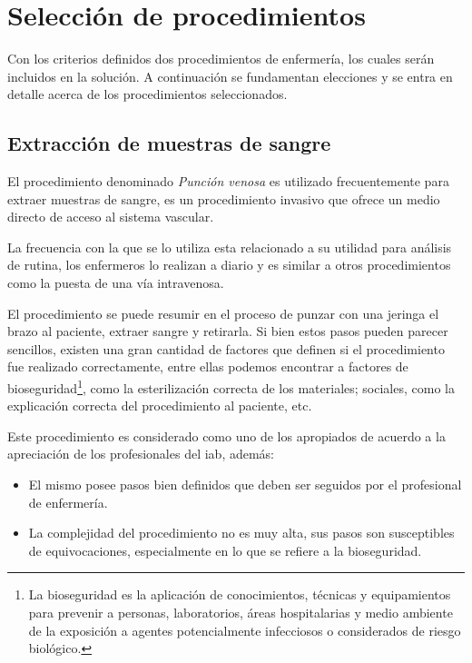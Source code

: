 \section{Selección de procedimientos}
\label{sec:seleccion_escenas}

Con los criterios definidos  dos procedimientos
de enfermería, los cuales serán incluidos en la solución. A continuación se
fundamentan  elecciones y se entra en detalle acerca de los
procedimientos seleccionados.


\subsection{Extracción de muestras de sangre}
\label{sec:hemocultivo}

El procedimiento denominado \emph{Punción venosa} es utilizado frecuentemente
para extraer muestras de sangre, es un procedimiento invasivo que ofrece un
medio directo de acceso al sistema vascular. 

La frecuencia con la que se lo utiliza esta relacionado a su utilidad para
análisis de rutina, los enfermeros lo realizan a diario y es similar a otros
procedimientos como la puesta de una vía intravenosa.

El procedimiento se puede resumir en el proceso de punzar con una jeringa el
brazo al paciente, extraer sangre y retirarla. Si bien estos pasos pueden
parecer sencillos, existen una gran cantidad de factores que definen si el
procedimiento fue realizado correctamente, entre ellas podemos encontrar a
factores de bioseguridad\footnote{La bioseguridad es la aplicación de
    conocimientos, técnicas y equipamientos para prevenir a personas,
    laboratorios, áreas hospitalarias y medio ambiente de la exposición a
    agentes potencialmente infecciosos o considerados de riesgo biológico.},
como la esterilización correcta de los materiales; sociales, como la explicación
correcta del procedimiento al paciente, etc.

Este procedimiento es considerado como uno de los apropiados de acuerdo a la
apreciación de los profesionales del \Gls{iab}, además: 

\begin{itemize}
\item El mismo posee pasos bien definidos que deben ser seguidos por el
    profesional de enfermería.
\item La complejidad del procedimiento no es muy alta, sus pasos son
    susceptibles de equivocaciones, especialmente en lo que se refiere a la
    bioseguridad. 
\end{itemize}



